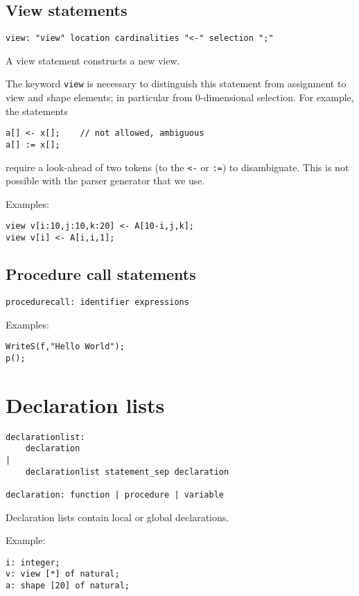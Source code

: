 \documentclass[a4paper]{article}
\begin{document}
\subsection{View statements}
\begin{verbatim}
view: "view" location cardinalities "<-" selection ";"
\end{verbatim}
A view statement constructs a new view.
\par
The keyword \verb'view' is necessary to distinguish this statement from
assignment to view and shape elements; in particular from 0-dimensional
selection. For example, the statements
\begin{verbatim}
a[] <- x[];    // not allowed, ambiguous
a[] := x[];
\end{verbatim}
require a look-ahead of two tokens (to the \verb'<-' or \verb':=') to
disambiguate. This is not possible with the parser generator that we use.
\par
Examples:
\begin{verbatim}
view v[i:10,j:10,k:20] <- A[10-i,j,k];
view v[i] <- A[i,i,1];
\end{verbatim}
\subsection{Procedure call statements}
\begin{verbatim}
procedurecall: identifier expressions
\end{verbatim}
Examples:
\begin{verbatim}
WriteS(f,"Hello World");
p();
\end{verbatim}

\section{Declaration lists}
\begin{verbatim}
declarationlist:
    declaration
|
    declarationlist statement_sep declaration

declaration: function | procedure | variable
\end{verbatim}
Declaration lists contain local or global declarations.
\par
Example:
\begin{verbatim}
i: integer;
v: view [*] of natural;
a: shape [20] of natural;
\end{verbatim}
\end{document}
